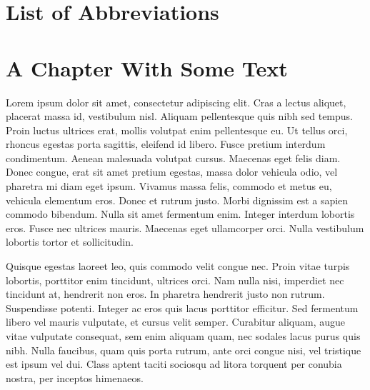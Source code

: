 \documentclass[
  12pt,
  letterpaper,
]{report}
\renewcommand{\part}[1]{\addcontentsline{toc}{part}{#1}}
\begin{document}

\vspace{-3 cm}

\listoffigures


\hypertarget{list-of-abbreviations}{%
\chapter*{List of Abbreviations}\label{list-of-abbreviations}}


\renewcommand\thepage{\romannumeral\numexpr\value{page}\relax}

\part{Chapters}

\hypertarget{a-chapter-with-some-text}{%
\chapter{A Chapter With Some Text}\label{a-chapter-with-some-text}}

\setcounter{page}{1}

Lorem ipsum dolor sit amet, consectetur adipiscing elit. Cras a lectus
aliquet, placerat massa id, vestibulum nisl. Aliquam pellentesque quis
nibh sed tempus. Proin luctus ultrices erat, mollis volutpat enim
pellentesque eu. Ut tellus orci, rhoncus egestas porta sagittis,
eleifend id libero. Fusce pretium interdum condimentum. Aenean malesuada
volutpat cursus. Maecenas eget felis diam. Donec congue, erat sit amet
pretium egestas, massa dolor vehicula odio, vel pharetra mi diam eget
ipsum. Vivamus massa felis, commodo et metus eu, vehicula elementum
eros. Donec et rutrum justo. Morbi dignissim est a sapien commodo
bibendum. Nulla sit amet fermentum enim. Integer interdum lobortis eros.
Fusce nec ultrices mauris. Maecenas eget ullamcorper orci. Nulla
vestibulum lobortis tortor et sollicitudin.

Quisque egestas laoreet leo, quis commodo velit congue nec. Proin vitae
turpis lobortis, porttitor enim tincidunt, ultrices orci. Nam nulla
nisi, imperdiet nec tincidunt at, hendrerit non eros. In pharetra
hendrerit justo non rutrum. Suspendisse potenti. Integer ac eros quis
lacus porttitor efficitur. Sed fermentum libero vel mauris vulputate, et
cursus velit semper. Curabitur aliquam, augue vitae vulputate consequat,
sem enim aliquam quam, nec sodales lacus purus quis nibh. Nulla
faucibus, quam quis porta rutrum, ante orci congue nisi, vel tristique
est ipsum vel dui. Class aptent taciti sociosqu ad litora torquent per
conubia nostra, per inceptos himenaeos.
\end{document}
